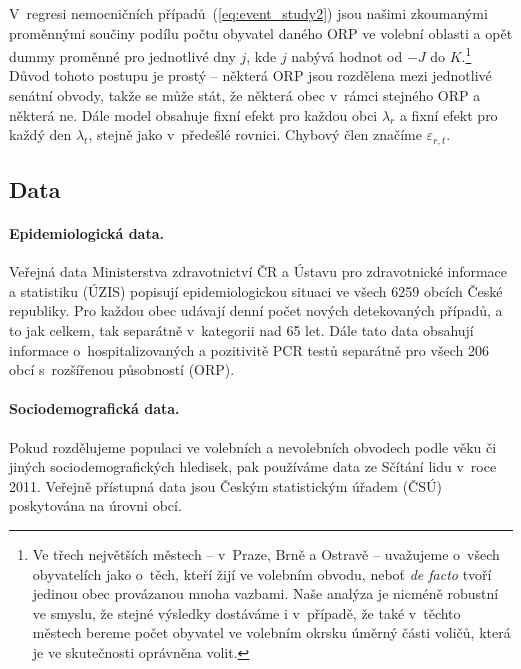 V~regresi nemocničních případů~(\ref{eq:event_study2}) jsou našimi zkoumanými proměnnými sou\-či\-ny podílu počtu obyvatel daného ORP ve volební oblasti a opět dummy proměnné pro jednotlivé dny $j$, kde $j$ nabývá hodnot od $-J$ do $K$.\footnote{Ve třech největších městech -- v~Praze, Brně a Ostravě -- uvažujeme o~všech obyvatelích jako o~těch, kteří žijí ve volebním obvodu, neboť \textit{de facto} tvoří jedinou obec provázanou mnoha vazbami. Naše analýza je nicméně robustní ve smyslu, že stejné výsledky dostáváme i v~případě, že také v~těchto městech bereme počet obyvatel ve volebním okrsku úměrný části voličů, která je ve skutečnosti oprávněna volit.} Důvod tohoto postupu je prostý -- některá ORP jsou rozdělena mezi jednotlivé senátní obvody, takže se může stát, že některá obec v~rámci stejného ORP  a některá ne. Dále model obsahuje fixní efekt pro každou obci $\lambda_{r}$ a fixní efekt pro každý den $\lambda_{t}$, stejně jako v~předešlé rovnici. Chybový člen značíme $\varepsilon_{r,t}$.

\subsection*{Data}
\paragraph{Epidemiologická data.}  Veřejná data Ministerstva zdravotnictví ČR a Ústavu pro zdravotnické informace a statistiku (ÚZIS) popisují epidemiologickou situaci ve všech 6259 obcích České republiky. Pro každou obec udávají denní počet nových detekovaných případů, a to jak celkem, tak separátně v~kategorii nad 65 let. Dále tato data obsahují informace o~hospitalizovaných a pozitivitě PCR testů separátně pro všech 206 obcí s~rozšířenou působností (ORP). 

\paragraph{Sociodemografická data.} 
Pokud rozdělujeme populaci ve volebních a ne\-vo\-leb\-ních obvodech podle věku či jiných sociodemografických hledisek, pak používáme data ze Sčítání lidu v~roce 2011. Veřejně přístupná data jsou Českým statistickým úřadem (ČSÚ) poskytována na úrovni obcí.

